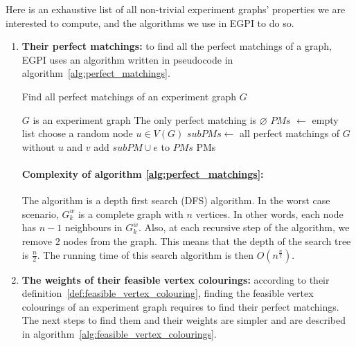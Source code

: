 Here is an exhaustive list of all non-trivial experiment graphs' properties we are interested to compute, and the algorithms we use in EGPI to do so.

\begin{enumerate}
    \item \textbf{Their perfect matchings:} to find all the perfect matchings of a graph, EGPI uses an algorithm written in pseudocode in algorithm~\ref{alg:perfect_matchings}.

        \begin{algorithm}
            \caption{Find all perfect matchings of an experiment graph $G$}
            \label{alg:perfect_matchings}
            \begin{algorithmic}
                \Require $G$ is an experiment graph
                    \State The only perfect matching is $\varnothing$
                    \State $PMs$ $\gets$ empty list
                    \State choose a random node $u \in V(G)$
                        \State $subPMs \gets$ all perfect matchings of $G$ without $u$ and $v$
                                \State add $subPM \cup e$ to $PMs$
                            \EndFor
                        \EndFor
                    \EndFor
                \EndIf
                \State \Return PMs
            \end{algorithmic}
        \end{algorithm}

        \paragraph{Complexity of algorithm \ref {alg:perfect_matchings}:}
        The algorithm is a depth first search (DFS) algorithm.
        In the worst case scenario, $G_k^w$ is a complete graph with $n$ vertices.
        In other words, each node has $n-1$ neighbours in $G_k^w$.
        Also, at each recursive step of the algorithm, we remove $2$ nodes from the graph.
        This means that the depth of the search tree is $\frac{n}{2}$.
        The running time of this search algorithm is then $O\left(n^\frac{n}{2}\right)$. \\     %

    \item \textbf{The weights of their feasible vertex colourings:} according to their definition~\ref{def:feasible_vertex_colouring}, finding the feasible vertex colourings of an experiment graph requires to find their perfect matchings.
        The next steps to find them and their weights are simpler and are described in algorithm~\ref{alg:feasible_vertex_colourings}.


\end{enumerate}
